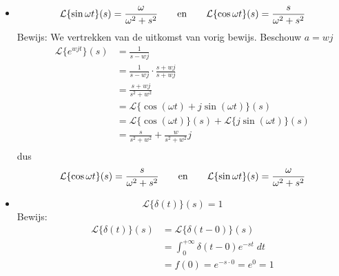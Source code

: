 \begin{itemize}
\item $$\mathcal{L}\{\sin \omega t\}(s) = \frac{\omega}{\omega^2 + s^2} \qquad  \hbox{en} \qquad  \mathcal{L}\{\cos \omega t\}(s) = \frac{s}{\omega^2 + s^2}$$
Bewijs: We vertrekken van de uitkomst van vorig bewijs. Beschouw $a = wj$
\begin{equation*}
\begin{split}
\mathcal{L}\{e^{wjt}\}(s) & = \frac{1}{s - wj} \\
                            & = \frac{1}{s - wj} \cdot \frac{s + wj}{s + wj} \\
                & = \frac{s + wj}{s^2 + w^2}\\
                & = \mathcal{L}\{\cos (\omega t) + j\sin(\omega t)\}(s) \\
                & = \mathcal{L}\{\cos (\omega t)\}(s) + \mathcal{L}\{j\sin(\omega t) \}(s) \\
                & = \frac{s}{s^2 + w^2} + \frac{w}{s^2 + w^2}j \\ 
\end{split}
\end{equation*}
dus $$\mathcal{L}\{\cos \omega t\}(s) = \frac{s}{\omega^2 + s^2} \qquad  \hbox{en} \qquad  \mathcal{L}\{\sin \omega t\}(s) = \frac{\omega}{\omega^2 + s^2}$$

\item 
$$\mathcal{L}\{\delta(t)\}(s) = 1$$
Bewijs:
\begin{equation*}
\begin{split}
    \mathcal{L}\{\delta(t)\}(s) & = \mathcal{L}\{\delta(t - 0)\}(s) \\
                & = \int_{0}^{+\infty}\delta(t - 0)e^{-st}\;dt \\
                & = f(0) = e^{-s\cdot0} = e^{0} = 1
\end{split}
\end{equation*}
\end{itemize}
